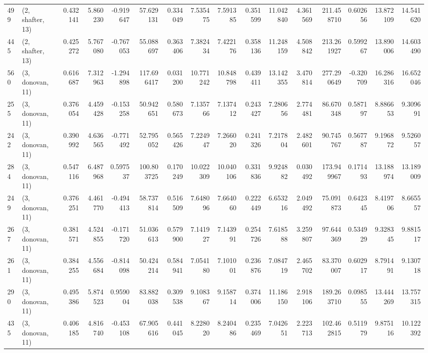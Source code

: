 \begin{tabular}{llrrrrrrrrrrrrrr}
499 &  (2, shafter, 13) &   0.432141 &   5.860230 &  -0.919647 &    57.629131 &   0.334049 &   7.535475 &   7.591385 &  0.351599 &  11.042840 &   4.361569 &   211.458710 &  0.602656 &  13.872109 &  14.541620 \\
445 &  (2, shafter, 13) &   0.425272 &   5.767080 &  -0.767053 &    55.088697 &   0.363406 &   7.382434 &   7.422176 &  0.358136 &  11.248159 &   4.508842 &   213.261927 &  0.599267 &  13.890006 &  14.603490 \\
560 &  (3, donovan, 11) &   0.616687 &   7.312963 &  -1.294898 &   117.696417 &   0.031200 &  10.771242 &  10.848798 &  0.439411 &  13.142355 &   3.470814 &   277.290649 & -0.320709 &  16.286316 &  16.652046 \\
255 &  (3, donovan, 11) &   0.376054 &   4.459428 &  -0.153258 &    50.942651 &   0.580673 &   7.135766 &   7.137412 &  0.243427 &   7.280656 &   2.774481 &    86.670348 &  0.587197 &   8.886653 &   9.309691 \\
242 &  (3, donovan, 11) &   0.390992 &   4.636565 &  -0.771492 &    52.795052 &   0.565426 &   7.224947 &   7.266020 &  0.241326 &   7.217804 &   2.482601 &    90.745767 &  0.567787 &   9.196872 &   9.526057 \\
284 &  (3, donovan, 11) &   0.547116 &   6.487968 &   0.597537 &   100.803725 &   0.170249 &  10.022309 &  10.040106 &  0.331836 &   9.924882 &   0.030492 &   173.949967 &  0.171493 &  13.188974 &  13.189009 \\
249 &  (3, donovan, 11) &   0.376251 &   4.461770 &  -0.494413 &    58.737814 &   0.516509 &   7.648096 &   7.664060 &  0.222449 &   6.653216 &   2.049492 &    75.091873 &  0.642345 &   8.419706 &   8.665557 \\
267 &  (3, donovan, 11) &   0.381571 &   4.524855 &  -0.171720 &    51.036613 &   0.579900 &   7.141927 &   7.143991 &  0.254726 &   7.618588 &   3.259807 &    97.644369 &  0.534929 &   9.328345 &   9.881517 \\
261 &  (3, donovan, 11) &   0.384255 &   4.556684 &  -0.814098 &    50.424214 &   0.584941 &   7.054180 &   7.101001 &  0.236876 &   7.084719 &   2.465702 &    83.370007 &  0.602917 &   8.791491 &   9.130718 \\
290 &  (3, donovan, 11) &   0.495386 &   5.874523 &   0.959004 &    83.882038 &   0.309538 &   9.108367 &   9.158714 &  0.374006 &  11.186150 &   2.918106 &   189.263710 &  0.098555 &  13.444269 &  13.757315 \\
435 &  (3, donovan, 11) &   0.406185 &   4.816740 &  -0.453108 &    67.905616 &   0.441045 &   8.228020 &   8.240486 &  0.235469 &   7.042651 &   2.223713 &   102.462815 &  0.511979 &   9.875116 &  10.122392 \\

\end{tabular}
